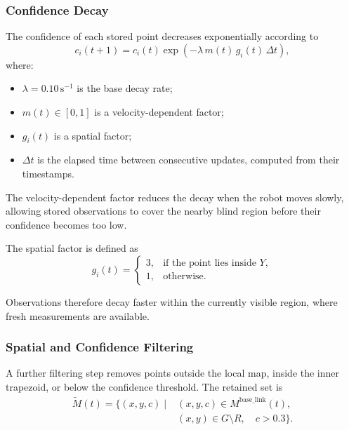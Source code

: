 \documentclass[a4paper,11pt,oneside]{book}
\begin{document}
\subsubsection{Confidence Decay}

The confidence of each stored point decreases exponentially
according to
\begin{equation}
    c_i(t+1)
    =
    c_i(t)
    \exp\left(
        -\lambda\,m(t)\,g_i(t)\,\Delta t
    \right),
    \label{eq:local_mapping_confidence_decay}
\end{equation}
where:
\begin{itemize}
    \item $\lambda=0.10\,\mathrm{s}^{-1}$ is the base decay rate;

    \item $m(t)\in[0,1]$ is a velocity-dependent factor;

    \item $g_i(t)$ is a spatial factor;

    \item $\Delta t$ is the elapsed time between consecutive
    updates, computed from their timestamps.
\end{itemize}

The velocity-dependent factor reduces the decay when the robot
moves slowly, allowing stored observations to cover the nearby
blind region before their confidence becomes too low.

The spatial factor is defined as
\begin{equation}
    g_i(t)
    =
    \begin{cases}
        3, & \text{if the point lies inside }Y, \\
        1, & \text{otherwise}.
    \end{cases}
    \label{eq:local_mapping_spatial_decay}
\end{equation}

Observations therefore decay faster within the currently visible
region, where fresh measurements are available.

\subsubsection{Spatial and Confidence Filtering}

A further filtering step removes points outside the local map,
inside the inner trapezoid, or below the confidence threshold.
The retained set is
\begin{equation}
    \begin{aligned}
        \widetilde{M}(t)
        =
        \bigl\{
            (x,y,c)
            \;\big|\;&
            (x,y,c)\in M^{\mathrm{base\_link}}(t), \\
            &(x,y)\in G\setminus R,
            \quad c>0.3
        \bigr\}.
    \end{aligned}
    \label{eq:local_mapping_filtered_memory}
\end{equation}
\end{document}
